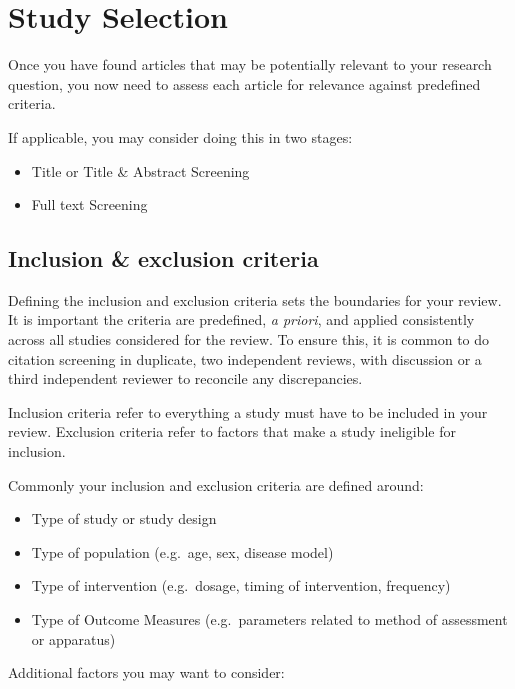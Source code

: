 \documentclass[
]{book}
\providecommand{\tightlist}{%
  \setlength{\itemsep}{0pt}\setlength{\parskip}{0pt}}
\begin{document}
\hypertarget{study-selection}{%
\chapter{Study Selection}\label{study-selection}}

Once you have found articles that may be potentially relevant to your research question, you now need to assess each article for relevance against predefined criteria.

If applicable, you may consider doing this in two stages:

\begin{itemize}
\tightlist
\item
  Title or Title \& Abstract Screening
\item
  Full text Screening
\end{itemize}

\hypertarget{inclusion-exclusion-criteria}{%
\section{Inclusion \& exclusion criteria}\label{inclusion-exclusion-criteria}}

Defining the inclusion and exclusion criteria sets the boundaries for your review.
It is important the criteria are predefined, \emph{a priori}, and applied consistently across all studies considered for the review. To ensure this, it is common to do citation screening in duplicate, two independent reviews, with discussion or a third independent reviewer to reconcile any discrepancies.

Inclusion criteria refer to everything a study must have to be included in your review.
Exclusion criteria refer to factors that make a study ineligible for inclusion.

Commonly your inclusion and exclusion criteria are defined around:

\begin{itemize}
\tightlist
\item
  Type of study or study design
\item
  Type of population (e.g.~age, sex, disease model)
\item
  Type of intervention (e.g.~dosage, timing of intervention, frequency)
\item
  Type of Outcome Measures (e.g.~parameters related to method of assessment or apparatus)
\end{itemize}

Additional factors you may want to consider:
\end{document}
